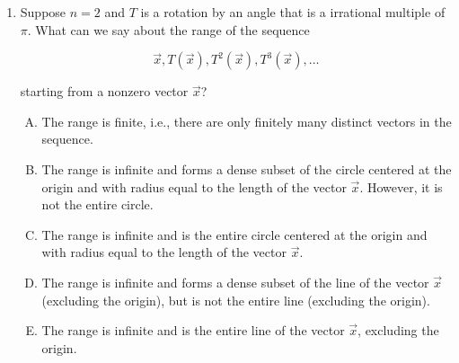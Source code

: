 \documentclass[10pt]{amsart}
\begin{document}
\begin{enumerate}
  {\em Answer}: Option (A)

  {\em Explanation}: If the angle of rotation for $T$ is $\theta$,
  then the angle of rotation for $T^r$ is $r\theta$. This is because
  angles of rotation add up when we compose the rotations.

  Since the angle of rotation $\theta$ is a rational multiple of
  $\pi$, it is of the form $p\pi/q$ where $p$ and $q$ are integers
  with $q \ne 0$. Then, $2q\theta = 2\pi p$. This implies that
  $T^{2q}$ is rotation by an integer multiple of $2\pi$, and hence, is
  the identity transformation. In particular, this means that for any
  nonzero vector $\vec{x}$, the sequence $\vec{x}, T(\vec{x}),
  T^2(\vec{x}), \dots$ returns to $\vec{x}$ at $T^{2q}(\vec{x})$. Beyond
  that point, it will just cycle the same set of vectors.

  {\em Performance review}: 11 out of 24 got this. 9 chose (C), 3
  chose (B), 1 chose (D).

  {\em Historical note (last time)}: $4$ out of $24$ got this. $12$ chose (B),
  $5$ chose (C), $2$ chose (E), $1$ chose (D).

\item Suppose $n = 2$ and $T$ is a rotation by an angle that is a
  irrational multiple of $\pi$. What can we say about the range of
  the sequence

  $$\vec{x}, T(\vec{x}), T^2(\vec{x}), T^3(\vec{x}), \dots$$

  starting from a nonzero vector $\vec{x}$?

  \begin{enumerate}[(A)]
  \item The range is finite, i.e., there are only finitely many
    distinct vectors in the sequence.
  \item The range is infinite and forms a dense subset of the circle
    centered at the origin and with radius equal to the length of the
    vector $\vec{x}$. However, it is not the entire circle.
  \item The range is infinite and is the entire circle centered at the
    origin and with radius equal to the length of the vector
    $\vec{x}$.
  \item The range is infinite and forms a dense subset of the line of
    the vector $\vec{x}$ (excluding the origin), but is not the entire
    line (excluding the origin).
  \item The range is infinite and is the entire line of the vector
    $\vec{x}$, excluding the origin.
  \end{enumerate}


\end{enumerate}
\end{document}
